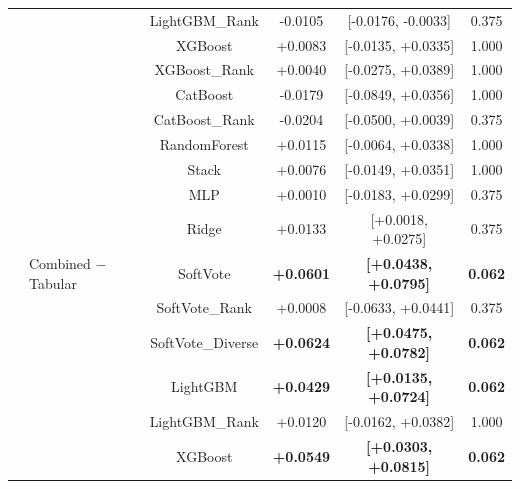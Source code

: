 \documentclass[10pt,journal,compsoc]{IEEEtran}
\begin{document}
\begin{table}[tbp]
\begin{tabular}{llcccc}
               &                          & LightGBM\_Rank     & -0.0105                & [-0.0176, -0.0033]               & 0.375      \\
               &                          & XGBoost            & +0.0083                & [-0.0135, +0.0335]               & 1.000      \\
               &                          & XGBoost\_Rank      & +0.0040                & [-0.0275, +0.0389]               & 1.000      \\
               &                          & CatBoost           & -0.0179                & [-0.0849, +0.0356]               & 1.000      \\
               &                          & CatBoost\_Rank     & -0.0204                & [-0.0500, +0.0039]               & 0.375      \\
               &                          & RandomForest       & +0.0115                & [-0.0064, +0.0338]               & 1.000      \\
               &                          & Stack              & +0.0076                & [-0.0149, +0.0351]               & 1.000      \\
               &                          & MLP                & +0.0010                & [-0.0183, +0.0299]               & 0.375      \\
               &                          & Ridge              & +0.0133                & [+0.0018, +0.0275]               & 0.375      \\
               & Combined $-$ Tabular     & SoftVote           & \textbf{+0.0601}       & \textbf{[+0.0438, +0.0795]}      & \textbf{0.062} \\
               &                          & SoftVote\_Rank     & +0.0008                & [-0.0633, +0.0441]               & 0.375      \\
               &                          & SoftVote\_Diverse  & \textbf{+0.0624}       & \textbf{[+0.0475, +0.0782]}      & \textbf{0.062} \\
               &                          & LightGBM           & \textbf{+0.0429}       & \textbf{[+0.0135, +0.0724]}      & \textbf{0.062} \\
               &                          & LightGBM\_Rank     & +0.0120                & [-0.0162, +0.0382]               & 1.000      \\
               &                          & XGBoost            & \textbf{+0.0549}       & \textbf{[+0.0303, +0.0815]}      & \textbf{0.062} \\

\end{tabular}
\end{table}
\end{document}
